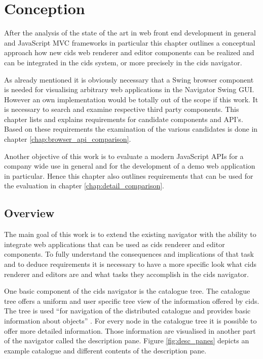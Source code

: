 \chapter{Conception}\label{chap:conception}
After the analysis of the state of the art in web front end development in general and JavaScript MVC frameworks in particular this chapter outlines a conceptual approach how new cids web renderer and editor components can be realized and can be integrated in the cids system, or more precisely in the cids navigator.

As already mentioned it is obviously necessary that a Swing browser component is needed for visualising arbitrary web applications in the Navigator Swing GUI.
However an own implementation would be totally out of the scope if this work. It is necessary to search and examine respective third party components.
This chapter lists and explains requirements for candidate components and API's.
Based on these requirements the examination of the various candidates is done in chapter \ref{chap:browser_api_comparison}.

Another objective of this work is to evaluate a modern JavaScript APIs for a company wide use in general and for the development of a demo web application in particular.
Hence this chapter also outlines requirements that can be used for the evaluation in chapter \ref{chap:detail_comparison}.

\section{Overview}

The main goal of this work is to extend the existing navigator with the ability to integrate web applications that can be used as cids renderer and editor components.
To fully understand the consequences and implications of that task and to deduce requirements it is necessary to have a more specific look what cids renderer and editors are and what tasks they accomplish in the cids navigator.

One basic component of the cids navigator is the catalogue tree.
The catalogue tree offers a uniform and user specific tree view of the information offered by cids.
The tree is used \enquote{for navigation of the distributed catalogue and provides basic information about objects} \autocite{cismet-cids-readMe}.
For every node in the catalogue tree it is possible to offer more detailed information.
Those information are visualised in another part of the navigator called the description pane.
Figure \ref{fig:desc_panes} depicts an example catalogue and different contents of the description pane.

